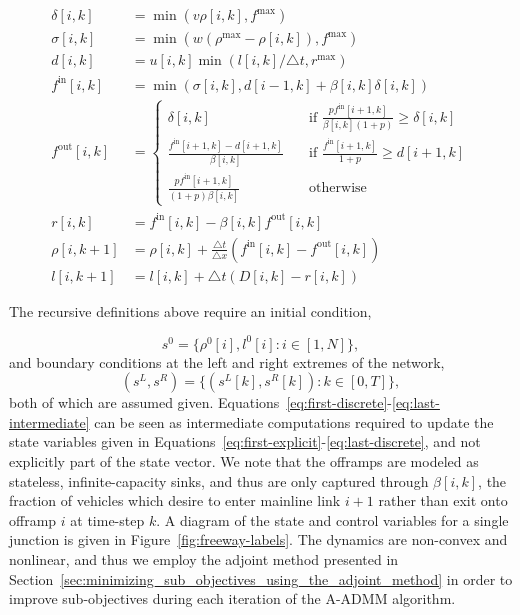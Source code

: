 \begin{align}
	\delta\left[i,k\right] & = \min\left(v \rho\left[i,k\right], f^{\max} \right) \label{eq:first-discrete}\\
	\sigma\left[i,k\right] & = \min\left(w\left(\rho^{\max} - \rho\left[i,k\right]\right), f^{\max}\right) \\
	d\left[i,k\right] & = u\left[i,k\right]\min \left(l\left[i,k\right] / \triangle t, r^{\max}\right) \label{eq:onramp-demand} \\
	f^{\text{in}}\left[i,k\right] & = \min\left(\sigma\left[i,k\right], d\left[i-1,k\right] + \beta\left[i,k\right] \delta\left[i,k\right]\right) \\
	f^{\text{out}}\left[i,k\right] & = 
	\begin{cases}
	\delta\left[i,k\right] & \quad \mbox{if } \frac{p f^{\text{in}}\left[i+1,k\right] }{\beta\left[i,k\right] \left(1 + p\right)} \ge \delta\left[i,k\right] \\
	\frac{f^{\text{in}}\left[i+1,k\right] - d\left[i+1,k\right]}{\beta\left[i,k\right]} & \quad \mbox{if } \frac{f^{\text{in}}[i+1,k]}{1 + p} \ge d\left[i+1,k\right] \\
	\frac{p f^{\text{in}}\left[i+1,k\right]}{\left(1 + p\right) \beta\left[i,k\right]} & \quad \mbox{otherwise}
	\end{cases} \\
	r\left[i,k\right] & = f^{\text{in}}\left[i,k\right] - \beta\left[i,k\right] f^{\text{out}}\left[i,k\right] \label{eq:last-intermediate}\\
	\rho\left[i,k+1\right] & = \rho\left[i,k\right] + \frac{\triangle t}{\triangle x} \left(f^{\text{in}}\left[i,k\right] - f^{\text{out}}\left[i,k\right]\right) \label{eq:first-explicit}\\
	l\left[i,k+1\right] & = l\left[i,k\right] + \triangle t \left(D\left[i,k\right] - r\left[i,k\right]\right) \label{eq:last-discrete}
\end{align}

The recursive definitions above require an initial condition,

\[
s^0=\{\rho^0\left[i\right], l^0\left[i\right]: i\in \left[1,N\right] \},
\]
and boundary conditions at the left and right extremes of the network,
\[
\left(s^L, s^R\right)=\{\left(s^L\left[k\right],s^R\left[k\right]\right):k\in \left[0,T\right]\},
\]
both of which are assumed given. Equations~\eqref{eq:first-discrete}-\eqref{eq:last-intermediate} can be seen as intermediate computations required to update the state variables given in Equations~\eqref{eq:first-explicit}-\eqref{eq:last-discrete}, and not explicitly part of the state vector. We note that the offramps are modeled as stateless, infinite-capacity sinks, and thus are only captured through $\beta\left[i,k\right]$, the fraction of vehicles which desire to enter mainline link $i+1$ rather than exit onto offramp $i$ at time-step $k$. A diagram of the state and control variables for a single junction is given in Figure~\ref{fig:freeway-labels}. The dynamics are non-convex and nonlinear, and thus we employ the adjoint method presented in Section~\ref{sec:minimizing_sub_objectives_using_the_adjoint_method} in order to improve sub-objectives during each iteration of the A-ADMM algorithm.

